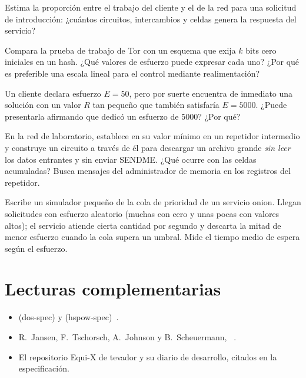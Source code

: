 \begin{esercizio}[2]\label{es:15-amplificazione}
Estima la proporción entre el trabajo del cliente y el de la red para una solicitud de introducción: ¿cuántos circuitos, intercambios y celdas genera la respuesta del servicio?
\end{esercizio}

\begin{esercizio}[2]\label{es:15-bit}
Compara la prueba de trabajo de Tor con un esquema que exija $k$ bits cero iniciales en un hash. ¿Qué valores de esfuerzo puede expresar cada uno? ¿Por qué es preferible una escala lineal para el control mediante realimentación?
\end{esercizio}

\begin{esercizio}[2]\label{es:15-sforzo}
Un cliente declara esfuerzo $E=50$, pero por suerte encuentra de inmediato una solución con un valor $R$ tan pequeño que también satisfaría $E=5000$. ¿Puede presentarla afirmando que dedicó un esfuerzo de 5000? ¿Por qué?
\end{esercizio}

\begin{esercizio}[3]\label{es:15-oom}
En la red de laboratorio, establece  en su valor mínimo en un repetidor intermedio y construye un circuito a través de él para descargar un archivo grande \emph{sin leer} los datos entrantes y sin enviar SENDME. ¿Qué ocurre con las celdas acumuladas? Busca mensajes del administrador de memoria en los registros del repetidor.
\end{esercizio}

\begin{esercizio}[3]\label{es:15-coda}
Escribe un simulador pequeño de la cola de prioridad de un servicio onion. Llegan solicitudes con esfuerzo aleatorio (muchas con cero y unas pocas con valores altos); el servicio atiende cierta cantidad por segundo y descarta la mitad de menor esfuerzo cuando la cola supera un umbral. Mide el tiempo medio de espera según el esfuerzo.
\end{esercizio}

\section*{Lecturas complementarias}
\begin{itemize}
  \item {} (dos-spec) y  (hspow-spec)~\cite{torspec}.
  \item R.~Jansen, F.~Tschorsch, A.~Johnson y B.~Scheuermann, ~\cite{jansen2014sniper}.
  \item El repositorio Equi-X de tevador y su diario de desarrollo, citados en la especificación.
\end{itemize}
